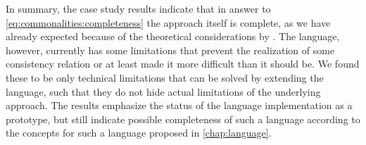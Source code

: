 In summary, the case study results indicate that in answer to \autoref{eq:commonalities:completeness} the \commonalities approach itself is complete, as we have already expected because of the theoretical considerations by \textcite{stevens2020BidirectionalTransformationLarge-SoSym}.
The \commonalities language, however, currently has some limitations that prevent the realization of some consistency relation or at least made it more difficult than it should be.
We found these to be only technical limitations that can be solved by extending the language, such that they do not hide actual limitations of the underlying \commonalities approach.
The results emphasize the status of the \commonalities language implementation as a prototype, but still indicate possible completeness of such a language according to the concepts for such a language proposed in \autoref{chap:language}.


